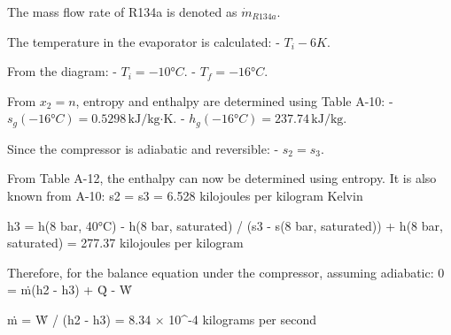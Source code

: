 The mass flow rate of R134a is denoted as \( \dot{m}_{R134a} \).  

The temperature in the evaporator is calculated:  
- \( T_i - 6K \).  

From the diagram:  
- \( T_i = -10°C \).  
- \( T_f = -16°C \).  

From \( x_2 = n \), entropy and enthalpy are determined using Table A-10:  
- \( s_g(-16°C) = 0.5298 \, \text{kJ/kg·K} \).  
- \( h_g(-16°C) = 237.74 \, \text{kJ/kg} \).  

Since the compressor is adiabatic and reversible:  
- \( s_2 = s_3 \).

From Table A-12, the enthalpy can now be determined using entropy. It is also known from A-10:  
s2 = s3 = 6.528 kilojoules per kilogram Kelvin  

h3 = h(8 bar, 40°C) - h(8 bar, saturated) / (s3 - s(8 bar, saturated)) + h(8 bar, saturated)  
= 277.37 kilojoules per kilogram  

Therefore, for the balance equation under the compressor, assuming adiabatic:  
0 = ṁ(h2 - h3) + Q̇ - Ẇ  

ṁ = Ẇ / (h2 - h3) = 8.34 × 10^-4 kilograms per second